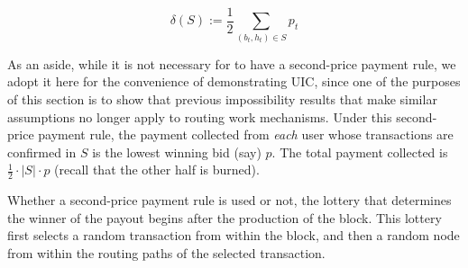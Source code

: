 \begin{equation}\label{eqn::burn}
    \delta(S) := \frac{1}{2} \sum_{(b_t,h_t)\in S} p_t
\end{equation}

As an aside, while it is not necessary for \ourTFM to have a second-price payment rule, we adopt it here for the convenience of demonstrating UIC, since one of the purposes of this section is to show that previous impossibility results that make similar assumptions no longer apply to routing work mechanisms. Under this second-price payment rule, the payment collected from \emph{each} user whose transactions are confirmed in $S$ is the lowest winning bid (say) $p$. The total payment collected is $\frac{1}{2}\cdot|S|\cdot p$ (recall that the other half is burned).

Whether a second-price payment rule is used or not, the lottery that determines the winner of the payout begins after the production of the block. This lottery first selects a random transaction from within the block, and then a random node from within the routing paths of the selected transaction. 

